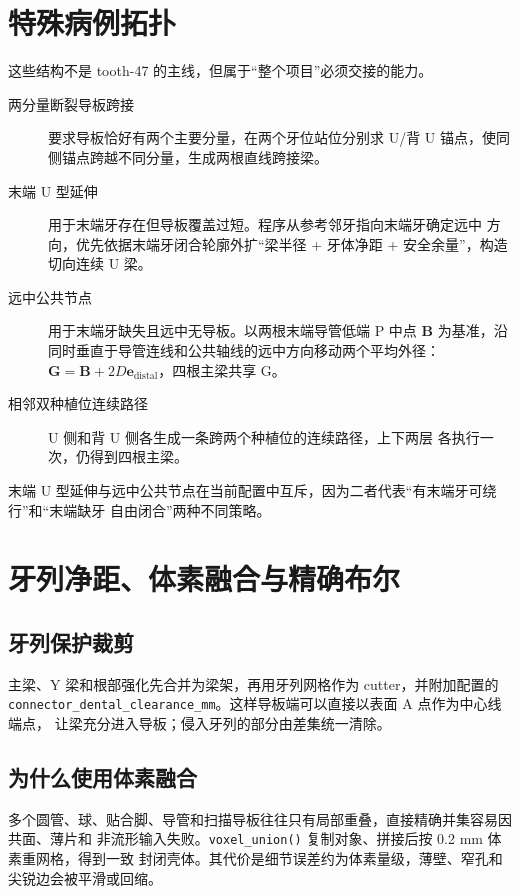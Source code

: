 \section{特殊病例拓扑}

这些结构不是 tooth-47 的主线，但属于“整个项目”必须交接的能力。

\begin{description}
  \item[两分量断裂导板跨接] 要求导板恰好有两个主要分量，在两个牙位站位分别求 U/背 U
  锚点，使同侧锚点跨越不同分量，生成两根直线跨接梁。
  \item[末端 U 型延伸] 用于末端牙存在但导板覆盖过短。程序从参考邻牙指向末端牙确定远中
  方向，优先依据末端牙闭合轮廓外扩“梁半径 + 牙体净距 + 安全余量”，构造切向连续 U 梁。
  \item[远中公共节点] 用于末端牙缺失且远中无导板。以两根末端导管低端 P 中点 $\mathbf B$
  为基准，沿同时垂直于导管连线和公共轴线的远中方向移动两个平均外径：
  $\mathbf G=\mathbf B+2D\mathbf e_{\mathrm{distal}}$，四根主梁共享 G。
  \item[相邻双种植位连续路径] U 侧和背 U 侧各生成一条跨两个种植位的连续路径，上下两层
  各执行一次，仍得到四根主梁。
\end{description}

末端 U 型延伸与远中公共节点在当前配置中互斥，因为二者代表“有末端牙可绕行”和“末端缺牙
自由闭合”两种不同策略。

\section{牙列净距、体素融合与精确布尔}

\subsection{牙列保护裁剪}

主梁、Y 梁和根部强化先合并为梁架，再用牙列网格作为 cutter，并附加配置的
\texttt{connector\_dental\_clearance\_mm}。这样导板端可以直接以表面 A 点作为中心线端点，
让梁充分进入导板；侵入牙列的部分由差集统一清除。

\subsection{为什么使用体素融合}

多个圆管、球、贴合脚、导管和扫描导板往往只有局部重叠，直接精确并集容易因共面、薄片和
非流形输入失败。\texttt{voxel\_union()} 复制对象、拼接后按 0.2 mm 体素重网格，得到一致
封闭壳体。其代价是细节误差约为体素量级，薄壁、窄孔和尖锐边会被平滑或回缩。

